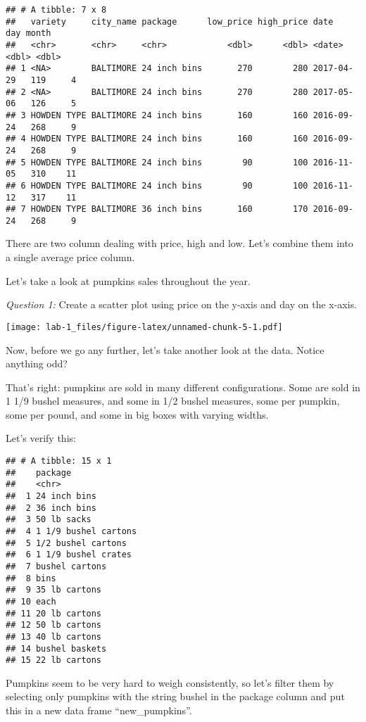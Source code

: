 \documentclass[
]{article}
\begin{document}
\begin{verbatim}
## # A tibble: 7 x 8
##   variety     city_name package      low_price high_price date         day month
##   <chr>       <chr>     <chr>            <dbl>      <dbl> <date>     <dbl> <dbl>
## 1 <NA>        BALTIMORE 24 inch bins       270        280 2017-04-29   119     4
## 2 <NA>        BALTIMORE 24 inch bins       270        280 2017-05-06   126     5
## 3 HOWDEN TYPE BALTIMORE 24 inch bins       160        160 2016-09-24   268     9
## 4 HOWDEN TYPE BALTIMORE 24 inch bins       160        160 2016-09-24   268     9
## 5 HOWDEN TYPE BALTIMORE 24 inch bins        90        100 2016-11-05   310    11
## 6 HOWDEN TYPE BALTIMORE 24 inch bins        90        100 2016-11-12   317    11
## 7 HOWDEN TYPE BALTIMORE 36 inch bins       160        170 2016-09-24   268     9
\end{verbatim}

There are two column dealing with price, high and low. Let's combine
them into a single average price column.

Let's take a look at pumpkins sales throughout the year.

\emph{Question 1:} Create a scatter plot using price on the y-axis and
day on the x-axis.

\texttt{[image: lab-1\_files/figure-latex/unnamed-chunk-5-1.pdf]}

Now, before we go any further, let's take another look at the data.
Notice anything odd?

That's right: pumpkins are sold in many different configurations. Some
are sold in 1 1/9 bushel measures, and some in 1/2 bushel measures, some
per pumpkin, some per pound, and some in big boxes with varying widths.

Let's verify this:

\begin{verbatim}
## # A tibble: 15 x 1
##    package             
##    <chr>               
##  1 24 inch bins        
##  2 36 inch bins        
##  3 50 lb sacks         
##  4 1 1/9 bushel cartons
##  5 1/2 bushel cartons  
##  6 1 1/9 bushel crates 
##  7 bushel cartons      
##  8 bins                
##  9 35 lb cartons       
## 10 each                
## 11 20 lb cartons       
## 12 50 lb cartons       
## 13 40 lb cartons       
## 14 bushel baskets      
## 15 22 lb cartons
\end{verbatim}

Pumpkins seem to be very hard to weigh consistently, so let's filter
them by selecting only pumpkins with the string bushel in the package
column and put this in a new data frame ``new\_pumpkins''.
\end{document}
